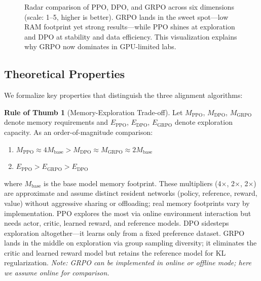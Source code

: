 \documentclass[12pt,a4paper]{report}
\theoremstyle{definition}
\newtheorem{ruleofthumb}[theorem]{Rule of Thumb}
\begin{document}
\begin{figure}[htbp]
\caption{Radar comparison of PPO, DPO, and GRPO across six dimensions (scale: 1--5, higher is better). GRPO lands in the sweet spot---low RAM footprint yet strong results---while PPO shines at exploration and DPO at stability and data efficiency. This visualization explains why GRPO now dominates in GPU-limited labs.}
\label{fig:algorithm_radar}
\end{figure}

\subsection{Theoretical Properties}

We formalize key properties that distinguish the three alignment algorithms:

\begin{ruleofthumb}[Memory-Exploration Trade-off]
\label{prop:tradeoff}
Let $M_{\text{PPO}}$, $M_{\text{DPO}}$, $M_{\text{GRPO}}$ denote memory requirements and $E_{\text{PPO}}$, $E_{\text{DPO}}$, $E_{\text{GRPO}}$ denote exploration capacity. As an order-of-magnitude comparison:
\begin{enumerate}
    \item $M_{\text{PPO}} \approx 4M_{\text{base}} > M_{\text{DPO}} \approx M_{\text{GRPO}} \approx 2M_{\text{base}}$
    \item $E_{\text{PPO}} > E_{\text{GRPO}} > E_{\text{DPO}}$
\end{enumerate}
where $M_{\text{base}}$ is the base model memory footprint. These multipliers (4$\times$, 2$\times$, 2$\times$) are approximate and assume distinct resident networks (policy, reference, reward, value) without aggressive sharing or offloading; real memory footprints vary by implementation. PPO explores the most via online environment interaction but needs actor, critic, learned reward, and reference models. DPO sidesteps exploration altogether---it learns only from a fixed preference dataset. GRPO lands in the middle on exploration via group sampling diversity; it eliminates the critic and learned reward model but retains the reference model for KL regularization. \textit{Note: GRPO can be implemented in online or offline mode; here we assume online for comparison.}
\end{ruleofthumb}
\end{document}
